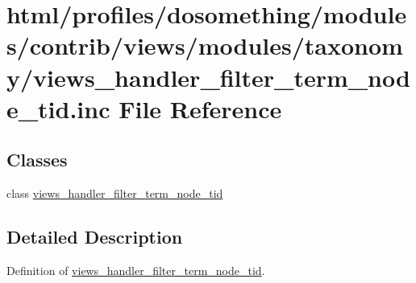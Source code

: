 \hypertarget{views__handler__filter__term__node__tid_8inc}{
\section{html/profiles/dosomething/modules/contrib/views/modules/taxonomy/views\_\-handler\_\-filter\_\-term\_\-node\_\-tid.inc File Reference}
\label{views__handler__filter__term__node__tid_8inc}
}
\subsection*{Classes}
\begin{DoxyCompactItemize}
\item 
class \hyperlink{classviews__handler__filter__term__node__tid}{views\_\-handler\_\-filter\_\-term\_\-node\_\-tid}
\end{DoxyCompactItemize}


\subsection{Detailed Description}
Definition of \hyperlink{classviews__handler__filter__term__node__tid}{views\_\-handler\_\-filter\_\-term\_\-node\_\-tid}. 